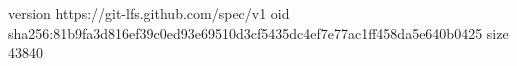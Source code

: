 version https://git-lfs.github.com/spec/v1
oid sha256:81b9fa3d816ef39c0ed93e69510d3cf5435dc4ef7e77ac1ff458da5e640b0425
size 43840
